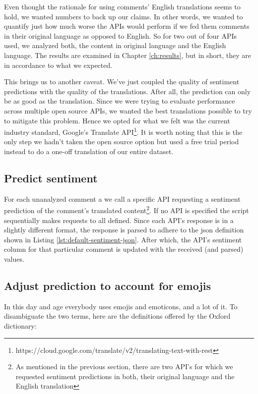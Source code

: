 Even thought the rationale for using comments' English translations seems to hold, we wanted numbers to back up our claims. In other words, we wanted to quantify just how much worse the APIs would perform if we fed them comments in their original language as opposed to English. So for two out of four APIs used, we analyzed both, the content in original language and the English language. The results are examined in Chapter \ref{ch:results}, but in short, they are in accordance to what we expected.

This brings us to another caveat. We've just coupled the quality of sentiment predictions with the quality of the translations. After all, the prediction can only be as good as the translation. Since we were trying to evaluate performance across multiple open source APIs,  we wanted the best translations possible to try to mitigate this problem. 
Hence we opted for what we felt was the current industry standard, Google's Translate API\footnote{https://cloud.google.com/translate/v2/translating-text-with-rest}.
It is worth noting that this is the only step we hadn't taken the open source option but used a free trial period instead to do a one-off translation of our entire dataset.

\subsection*{Predict sentiment\label{sec:predict-sentiment}}
For each unanalyzed comment a we call a specific API requesting a sentiment prediction of the comment's translated content\footnote{As mentioned in the previous section, there are two API's for which we requested sentiment predictions in both, their original language and the English translation}. 
If no API is specified the script sequentially makes requests to all defined.
Since each API's response is in a slightly different format, the response is parsed to adhere to the json definition shown in Listing \ref{lst:default-sentiment-json}. After which, the API's sentiment column for that particular comment is updated with the received (and parsed) values.

\subsection*{Adjust prediction to account for emojis\label{sec:adjust-prediction-to-account-for-emojis}}
In this day and age everybody uses emojis and emoticons, and a lot of it. 
To disambiguate the two terms, here are the definitions offered by the Oxford dictionary:

